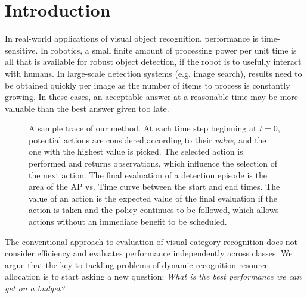 \section{Introduction}

In real-world applications of visual object recognition, performance is time-sensitive.%
In robotics, a small finite amount of processing power per unit time is all that is available for robust object detection, if the robot is to usefully interact with humans.
In large-scale detection systems (e.g. image search), results need to be obtained quickly per image as the number of items to process is constantly growing.
In these cases, an acceptable answer at a reasonable time may be more valuable than the best answer given too late.

\begin{figure}[ht!]
  \caption{
A sample trace of our method.
At each time step beginning at $t=0$, potential actions are considered according to their \emph{value}, and the one with the highest value is picked.
The selected action is performed and returns observations, which influence the selection of the next action.
The final evaluation of a detection episode is the area of the AP vs. Time curve between the start and end times.
The value of an action is the expected value of the final evaluation if the action is taken and the policy continues to be followed, which allows actions without an immediate benefit to be scheduled.
}
  \label{fig:figure1}
\end{figure}

The conventional approach to evaluation of visual category recognition does not consider efficiency and evaluates performance independently across classes.
We argue that the key to tackling problems of dynamic recognition resource allocation is to start asking a new question:
\emph{What is the best performance we can get on a budget?}

